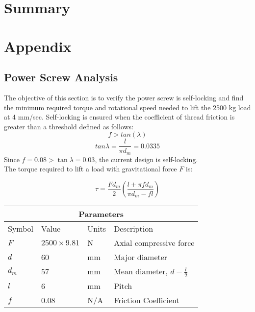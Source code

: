 \documentclass[letterpaper,12pt]{article}
\begin{document}
	\section{Summary}
	
	\newpage
	
	\section{Appendix}
	
	\subsection{Power Screw Analysis}
	
	The objective of this section is to verify the power screw is self-locking and find the minimum required torque and rotational speed needed to lift the 2500 kg load at 4 mm/sec.
	Self-locking is ensured when the coefficient of thread friction is greater than a threshold defined as follows:
	\begin{equation}
	f > tan(\lambda)
	\end{equation}
	$$tan\lambda = \frac{l}{\pi d_m} = 0.0335$$
    Since $f = 0.08 > \tan\lambda = 0.03$, the current design is self-locking. \\
    	
	The torque required to lift a load with gravitational force $F$ is:
	
	\begin{equation}
	\tau = \frac{Fd_m}{2}\left(\frac{l+\pi f d_m}{\pi d_m - fl}\right)
	\end{equation}
	
	\begin{center}
		\begin{tabular}{ |p{2cm}||p{3cm}|p{2cm}|p{7cm}|  }
			\hline
			\multicolumn{4}{|c|}{Parameters} \\
			\hline
			Symbol& Value & Units & Description\\
			\hline
			$F$ & $2500 \times 9.81$ & N & Axial compressive force\\
            $d$ & 60 & mm   & Major diameter\\			
			$d_m$ & 57 & mm   & Mean diameter, $d - \frac{l}{2}$\\
			$l$ & 6 & mm &  Pitch\\
			$f$ & 0.08 & N/A & Friction Coefficient\\
			\hline
		\end{tabular}
	\end{center}
	
\end{document}
